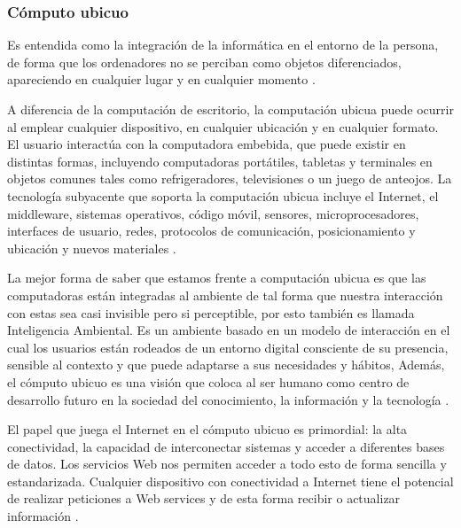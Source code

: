 

\subsubsection{ Cómputo ubicuo }

Es entendida como la integración de la informática en el entorno de la persona, de forma que los ordenadores no se perciban como objetos diferenciados, apareciendo en cualquier lugar y en cualquier momento \cite{IOEcu1}.
\\ \par
A diferencia de la computación de escritorio, la computación ubicua puede ocurrir al emplear cualquier dispositivo, en cualquier ubicación y en cualquier formato. El usuario interactúa con la computadora embebida, que puede existir en distintas formas, incluyendo computadoras portátiles, tabletas y terminales en objetos comunes tales como refrigeradores, televisiones o un juego de anteojos. La tecnología subyacente que soporta la computación ubicua incluye el Internet, el middleware, sistemas operativos, código móvil, sensores, microprocesadores, interfaces de usuario, redes, protocolos de comunicación, posicionamiento y ubicación y nuevos materiales \cite{IOEcu1}.
\\ \par
La mejor forma de saber que estamos frente a computación ubicua es que las computadoras están integradas al ambiente de tal forma que nuestra interacción con estas sea casi invisible pero si perceptible, por esto también es llamada Inteligencia Ambiental. Es un ambiente basado en un modelo de interacción en el cual los usuarios están rodeados de un entorno digital consciente de su presencia, sensible al contexto y que puede adaptarse a sus necesidades y hábitos, Además, el cómputo ubicuo es una visión que coloca al ser humano como centro de desarrollo futuro en la sociedad del conocimiento, la información y la tecnología \cite{IOEcu2}.
\\ \par

El papel que juega el Internet en el cómputo ubicuo es primordial: la alta conectividad, la capacidad de interconectar sistemas y acceder a diferentes bases de datos. Los servicios Web nos permiten acceder a todo esto de forma sencilla y estandarizada. Cualquier dispositivo con conectividad a Internet tiene el potencial de realizar peticiones a Web services y de esta forma recibir o actualizar información \cite{IOEcu2}.
\\ \par